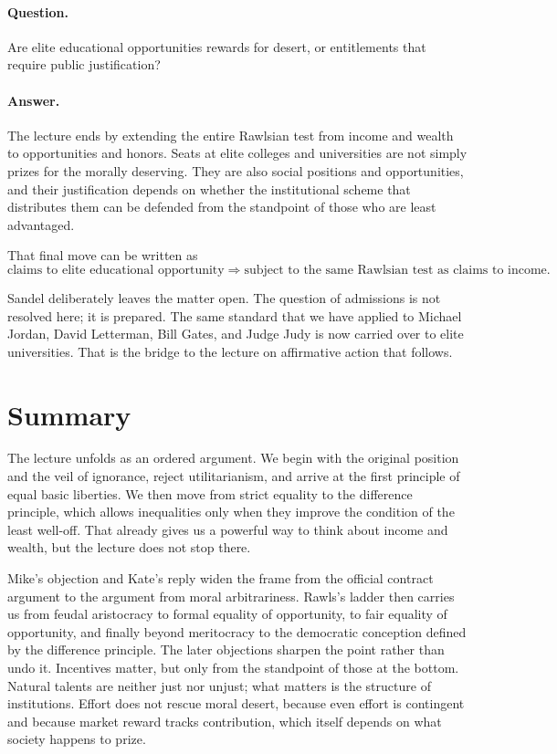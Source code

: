 \paragraph{Question.} Are elite educational opportunities rewards for desert, or entitlements that require public justification?

\paragraph{Answer.} The lecture ends by extending the entire Rawlsian test from income and wealth to opportunities and honors. Seats at elite colleges and universities are not simply prizes for the morally deserving. They are also social positions and opportunities, and their justification depends on whether the institutional scheme that distributes them can be defended from the standpoint of those who are least advantaged.

That final move can be written as
\begin{equation}
\text{claims to elite educational opportunity}
\Longrightarrow
\text{subject to the same Rawlsian test as claims to income}.
\end{equation}

Sandel deliberately leaves the matter open. The question of admissions is not resolved here; it is prepared. The same standard that we have applied to Michael Jordan, David Letterman, Bill Gates, and Judge Judy is now carried over to elite universities. That is the bridge to the lecture on affirmative action that follows.

\section{Summary}

The lecture unfolds as an ordered argument. We begin with the original position and the veil of ignorance, reject utilitarianism, and arrive at the first principle of equal basic liberties. We then move from strict equality to the difference principle, which allows inequalities only when they improve the condition of the least well-off. That already gives us a powerful way to think about income and wealth, but the lecture does not stop there.

Mike's objection and Kate's reply widen the frame from the official contract argument to the argument from moral arbitrariness. Rawls's ladder then carries us from feudal aristocracy to formal equality of opportunity, to fair equality of opportunity, and finally beyond meritocracy to the democratic conception defined by the difference principle. The later objections sharpen the point rather than undo it. Incentives matter, but only from the standpoint of those at the bottom. Natural talents are neither just nor unjust; what matters is the structure of institutions. Effort does not rescue moral desert, because even effort is contingent and because market reward tracks contribution, which itself depends on what society happens to prize.

